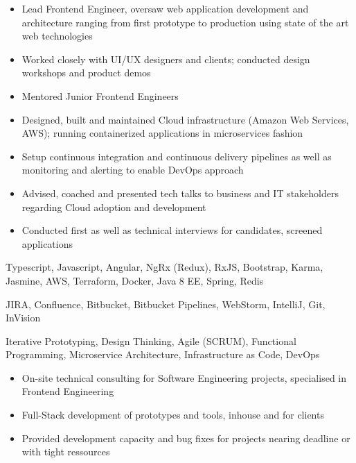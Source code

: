 
\medskip
\begin{itemize}
	\item Lead Frontend Engineer, oversaw web application development and architecture ranging from first prototype to production using state of the art web technologies
	\item Worked closely with UI/UX designers and clients; conducted design workshops and product demos
	\item Mentored Junior Frontend Engineers
	\item Designed, built and maintained Cloud infrastructure (Amazon Web Services, AWS); running containerized applications in microservices fashion
	\item Setup continuous integration and continuous delivery pipelines as well as monitoring and alerting to enable DevOps approach
	\item Advised, coached and presented tech talks to business and IT stakeholders regarding Cloud adoption and development
	\item Conducted first as well as technical interviews for candidates, screened applications
\end{itemize}

\medskip
\begin{description}
	\ifincludestech
	\item [Technologies] Typescript, Javascript, Angular, NgRx (Redux), RxJS, Bootstrap, Karma, Jasmine, AWS, Terraform, Docker, Java 8 EE, Spring, Redis
	\fi
	\ifincludestools
	\item [Tools] JIRA, Confluence, Bitbucket, Bitbucket Pipelines, WebStorm, IntelliJ, Git, InVision
	\fi
	\ifincludesmethods
	\item [Methodologies] Iterative Prototyping, Design Thinking, Agile (SCRUM), Functional Programming, Microservice Architecture, Infrastructure as Code, DevOps
	\fi
\end{description}

\divider


\medskip
\begin{itemize}
	\item On-site technical consulting for Software Engineering projects, specialised in Frontend Engineering
	\item Full-Stack development of prototypes and tools, inhouse and for clients
	\item Provided development capacity and bug fixes for projects nearing deadline or with tight ressources
\end{itemize}

